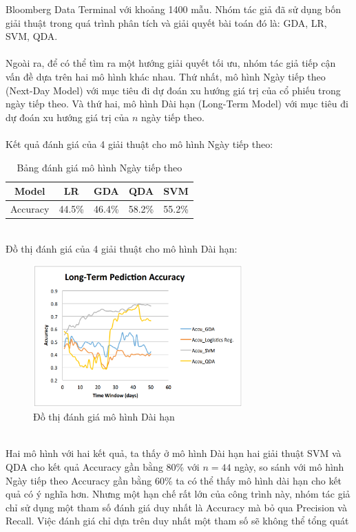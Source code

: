 Bloomberg Data Terminal với khoảng 1400 mẫu. Nhóm tác giả đã sử dụng bốn 
giải thuật trong quá trình phân tích và giải quyết bài toán đó là: GDA, LR, SVM, 
QDA.\\\\
Ngoài ra, để có thể tìm ra một hướng giải quyết tối ưu, nhóm tác giả tiếp cận 
vấn đề dựa trên hai mô hình khác nhau. Thứ nhất, mô hình Ngày tiếp theo (Next-Day 
Model) với mục tiêu đi dự đoán xu hướng giá trị của cổ phiếu trong ngày tiếp 
theo. Và thứ hai, mô hình Dài hạn (Long-Term Model) với mục tiêu đi dự đoán xu 
hướng giá trị của $n$ ngày tiếp theo.\\\\
Kết quả đánh giá của 4 giải thuật cho mô hình Ngày tiếp theo:
\begin{table}[h]
\centering
\fontsize{8}{9}\selectfont
\begin{tabular}{ |c|c|c|c|c| }
\hline
Model & LR & GDA & QDA & SVM \\
\hline
Accuracy & 44.5\% & 46.4\% & 58.2\% & 55.2\% \\
\hline
\end{tabular}
\caption{Bảng đánh giá mô hình Ngày tiếp theo }
\end{table}\\
Đồ thị đánh giá của 4 giải thuật cho mô hình Dài hạn:
\begin{figure}[h!]
\centering
\includegraphics[height=2.15in, keepaspectratio=true]{longtermmodel.png}
\caption{Đồ thị đánh giá mô hình Dài hạn}
\end{figure}\\
Hai mô hình với hai kết quả, ta thấy ở mô hình Dài hạn hai giải thuật SVM và 
QDA cho kết quả Accuracy gần bằng 80\% với $n=44$ ngày, so sánh với mô hình 
Ngày tiếp theo Accuracy gần bằng 60\% ta có thể thấy mô hình dài hạn cho kết 
quả có ý nghĩa hơn. Nhưng một hạn chế rất lớn của công trình này, nhóm tác giả 
chỉ sử dụng một tham số đánh giá duy nhất là Accuracy mà bỏ qua Precision và 
Recall. Việc đánh giá chỉ dựa trên duy nhất một tham số sẽ không thể tổng quát 

